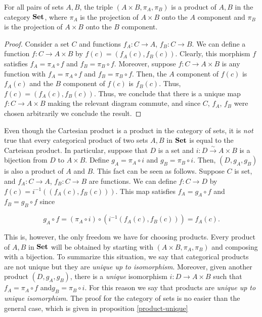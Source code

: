 \begin{prop}\label{product-in-set} For all pairs of sets $A,B$, the triple $(A\times B,\pi_A,\pi_B)$ is a product of $A,B$ in the category ${\bf Set}$, where $\pi_A$ is the projection of $A\times B$ onto the $A$ component and $\pi_B$ is the projection of $A\times B$ onto the $B$ component.
\end{prop}
\begin{proof} Consider a set $C$ and functions $f_A:C\to A$, $f_B:C\to B$. We can define a function $f:C\to A\times B$ by $f(c)=(f_A(c),f_B(c))$. Clearly, this morphism $f$ satisfies $f_A=\pi_A\circ f$ and $f_B=\pi_B\circ f$. Moreover, suppose $f:C\to A\times B$ is any function with $f_A=\pi_A\circ f$ and $f_B=\pi_B\circ f$. Then, the $A$ component of $f(c)$ is $f_A(c)$ and the $B$ component of $f(c)$ is $f_B(c)$. Thus, $f(c)=(f_A(c),f_B(c))$. Thus, we conclude that there is a unique map $f:C\to A\times B$ making the relevant diagram commute, and since $C$, $f_A$, $f_B$ were chosen arbitrarily we conclude the result.
\end{proof}

\begin{rem} Even though the Cartesian product is a product in the category of sets, it is {\em not} true that every categorical product of two sets $A,B$ in ${\bf Set}$ is equal to the Carteisan product. In particular, suppose that $D$ is a set and $i:D\xrightarrow{\sim}A\times B$ is a bijection from $D$ to $A\times B$. Define $g_A=\pi_A\circ i$ and $g_B=\pi_B\circ i$. Then, $(D,g_A,g_B)$ is also a product of $A$ and $B$. This fact can be seen as follows. Suppose $C$ is set, and $f_A:C\to A$, $f_B:C\to B$ are functions. We can define $f:C\to D$ by $f(c)=i^{-1}((f_A(c),f_B(c)))$. This map satisfies $f_A=g_A\circ f$ and $f_B=g_B\circ f$ since

$$g_A\circ f =(\pi_A\circ i)\circ (i^{-1}(f_A(c),f_B(c)))=f_A(c).$$

This is, however, the only freedom we have for choosing products. Every product of $A,B$ in ${\bf Set}$ will be obtained by starting with $(A\times B,\pi_A,\pi_B)$ and composing with a bijection. To summarize this situation, we say that categorical products are not unique but they are {\em unique up to isomorphism}. Moreover, given another product $(D,g_A,g_B)$, there is a {\em unique} isomorphism $i:D\to A\times B$ such that $f_A=\pi_A\circ f$ and$g_B=\pi_B\circ i$. For this reason we say that products are {\em unique up to unique isomorphism}. The proof for the category of sets is no easier than the general case, which is given in proposition \ref{product-unique}
\end{rem}

